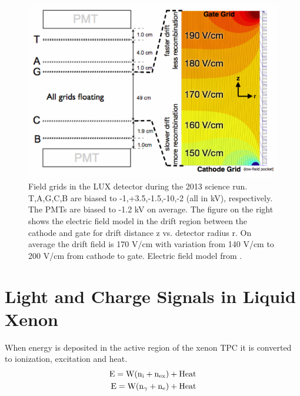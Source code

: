  \begin{figure}[h!]\centering
\includegraphics[scale=.4]{Chapter_LUX_Det/LUX_Feild_Grids_with_Field.png}
\caption{Field grids in the LUX detector during the 2013 science run. T,A,G,C,B are biased to -1,+3.5,-1.5,-10,-2 (all in kV), respectively. The PMTs are biased to -1.2 kV on average. The figure on the right shows the electric field model in the drift region between the cathode and gate for drift distance z vs. detector radius r. On average the drift field is 170 V/cm with variation from 140 V/cm to 200 V/cm  from cathode to gate. Electric field model from  \cite{Scott_E_Field}.}
\label{fig:LUX_Fields}
\end{figure}

\newpage

\section{Light and Charge Signals in Liquid Xenon}
\label{sec:LXe_Theory}
When energy is deposited in the active region of the xenon TPC it is converted to ionization, excitation and heat.
\begin{equation}
\begin{split}
\rm E= W (n_i + n_{ex}) + Heat \\
\rm E= W (n_\gamma + n_e) + Heat \\
\label{eq:E_Q}
\end{split}
\end{equation}

